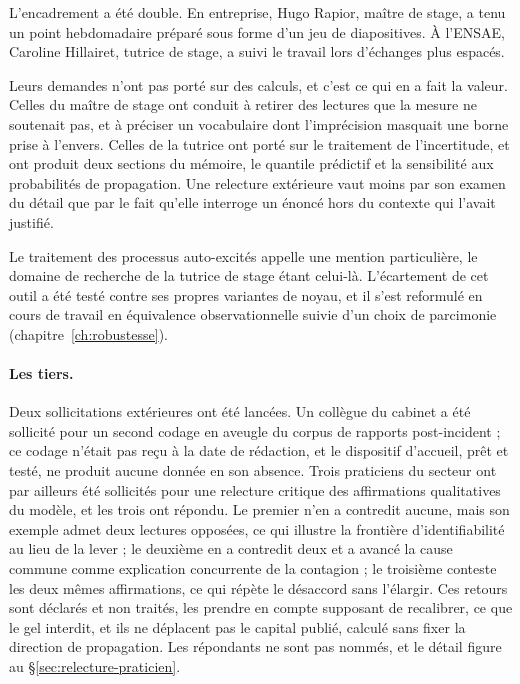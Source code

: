 L'encadrement a été double. En entreprise, Hugo Rapior, maître de stage, a tenu un
point hebdomadaire préparé sous forme d'un jeu de diapositives. À l'ENSAE, Caroline
Hillairet, tutrice de stage, a suivi le travail lors d'échanges plus espacés.

Leurs demandes n'ont pas porté sur des calculs, et c'est ce qui en a fait la valeur.
Celles du maître de stage ont conduit à retirer des lectures que la mesure ne
soutenait pas, et à préciser un vocabulaire dont l'imprécision masquait une borne
prise à l'envers. Celles de la tutrice ont porté sur le traitement de l'incertitude,
et ont produit deux sections du mémoire, le quantile prédictif et la sensibilité aux
probabilités de propagation. Une relecture extérieure vaut moins par son examen du
détail que par le fait qu'elle interroge un énoncé hors du contexte qui l'avait
justifié.

Le traitement des processus auto-excités appelle une mention particulière, le
domaine de recherche de la tutrice de stage étant celui-là. L'écartement de cet
outil a été testé contre ses propres variantes de noyau, et il s'est reformulé en
cours de travail en équivalence observationnelle suivie d'un choix de parcimonie
(chapitre~\ref{ch:robustesse}).

\paragraph{Les tiers.} Deux sollicitations extérieures ont été lancées. Un collègue
du cabinet a été sollicité pour un second codage en aveugle du corpus de rapports
post-incident ; ce codage n'était pas reçu à la date de rédaction, et le dispositif
d'accueil, prêt et testé, ne produit aucune donnée en son absence. Trois praticiens
du secteur ont par ailleurs été sollicités pour une relecture critique des
affirmations qualitatives du modèle, et les trois ont répondu. Le
premier n'en a contredit aucune, mais son exemple admet deux lectures opposées, ce
qui illustre la frontière d'identifiabilité au lieu de la lever ; le deuxième en a
contredit deux et a avancé la cause commune comme explication concurrente de la
contagion ; le troisième conteste les deux mêmes affirmations, ce qui répète le
désaccord sans l'élargir. Ces retours sont déclarés et non traités, les prendre en compte supposant
de recalibrer, ce que le gel interdit, et ils ne déplacent pas le capital publié,
calculé sans fixer la direction de propagation. Les répondants ne sont pas nommés,
et le détail figure au \S\ref{sec:relecture-praticien}.

